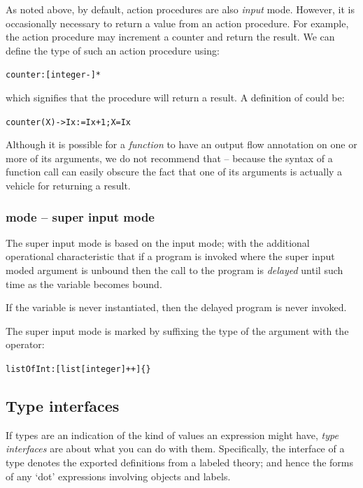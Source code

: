 As noted above, by default, action procedures are also \emph{input} mode. However, it is occasionally necessary to return a value from an action procedure. For example, the  action procedure may increment a counter and return the result. We can define the type of such an action procedure using:
\begin{alltt}
counter:[integer-]*
\end{alltt}
which signifies that the  procedure will return a result. A definition of  could be:
\begin{alltt}
counter(X) -> Ix := Ix+1; X=Ix
\end{alltt}
\begin{aside}
Although it is possible for a \emph{function} to have an output flow annotation on one or more of its arguments, we do not recommend that -- because the syntax of a function call can easily obscure the fact that one of its arguments is actually a vehicle for returning a result.
\end{aside}

\subsubsection{\q{++} mode -- super input mode}
\label{types:superinput}

The super input mode is based on the input mode; with the additional operational characteristic that if a program is invoked where the super input moded argument is unbound then the call to the program is \emph{delayed} until such time as the variable becomes bound.

If the variable is never instantiated, then the delayed program is never invoked.

The super input mode is marked by suffixing the type of the argument with the \q{++} operator:
\begin{alltt}
listOfInt:[list[integer]++]\{\}
\end{alltt}

\subsection{Type interfaces}
If types are an indication of the kind of values an expression might have, \emph{type interfaces} are about what you can do with them. Specifically, the interface of a type denotes the exported definitions from a labeled theory; and hence the forms of any `dot' expressions involving objects and labels.

